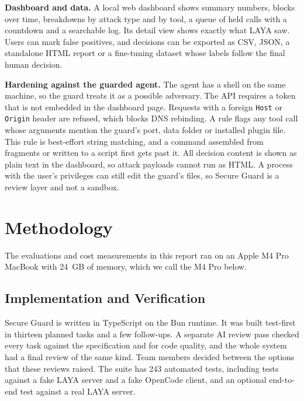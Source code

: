 \documentclass[sigconf,nonacm]{acmart}
\begin{document}
\textbf{Dashboard and data.} A local web dashboard shows summary numbers, blocks over time, breakdowns by attack type and by tool, a queue of held calls with a countdown and a searchable log. Its detail view shows exactly what LAYA saw. Users can mark false positives, and decisions can be exported as CSV, JSON, a standalone HTML report or a fine-tuning dataset whose labels follow the final human decision.

\textbf{Hardening against the guarded agent.} The agent has a shell on the same machine, so the guard treats it as a possible adversary. The API requires a token that is not embedded in the dashboard page. Requests with a foreign \texttt{Host} or \texttt{Origin} header are refused, which blocks DNS rebinding. A rule flags any tool call whose arguments mention the guard's port, data folder or installed plugin file. This rule is best-effort string matching, and a command assembled from fragments or written to a script first gets past it. All decision content is shown as plain text in the dashboard, so attack payloads cannot run as HTML. A process with the user's privileges can still edit the guard's files, so Secure Guard is a review layer and not a sandbox.

\section{Methodology}
The evaluations and cost measurements in this report ran on an Apple M4 Pro MacBook with 24~GB of memory, which we call the M4 Pro below.

\subsection{Implementation and Verification}
Secure Guard is written in TypeScript on the Bun runtime. It was built test-first in thirteen planned tasks and a few follow-ups. A separate AI review pass checked every task against the specification and for code quality, and the whole system had a final review of the same kind. Team members decided between the options that these reviews raised. The suite has 243 automated tests, including tests against a fake LAYA server and a fake OpenCode client, and an optional end-to-end test against a real LAYA server.
\end{document}
